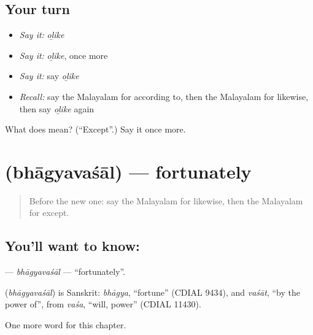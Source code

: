 \subsection*{Your turn}
\begin{itemize}
\raggedright
  \item \emph{Say it:} \emph{oḻike}
  \item \emph{Say it:} \emph{oḻike}, once more
  \item \emph{Say it:} say \emph{oḻike}
  \item \emph{Recall:} say the Malayalam for according to, then the Malayalam for likewise, then say \emph{oḻike} again
\end{itemize}

\begin{tcolorbox}[breakable,colback=teal!4,colframe=teal!35!black,title={Before you move on}]
What does  mean? (\textquotedblleft{}Except\textquotedblright{}.) Say it once more.
\end{tcolorbox}
\section[\texorpdfstring{\ml{ഭാഗ്യവശാൽ} (bhāgyavaśāl)}{ഭാഗ്യവശാൽ (bhāgyavaśāl)}]{ (bhāgyavaśāl) — fortunately}

\label{lesson:ML-C201-bhagyavasal}



\begin{quote}
Before the new one: say the Malayalam for likewise, then the Malayalam for except.
\end{quote}

\subsection*{You'll want to know: }
\textbf{} — \emph{bhāgyavaśāl} — \textquotedblleft{}fortunately\textquotedblright{}.

\begin{cousinweb}
\textbf{} (\emph{bhāgyavaśāl}) is Sanskrit: \emph{bhāgya}, \textquotedblleft{}fortune\textquotedblright{} (CDIAL 9434), and \emph{vaśāt}, \textquotedblleft{}by the power of\textquotedblright{}, from \emph{vaśa}, \textquotedblleft{}will, power\textquotedblright{} (CDIAL 11430).
\end{cousinweb}

\begin{grammarlens}[title={What you've built}]
One more word for this chapter.
\end{grammarlens}

